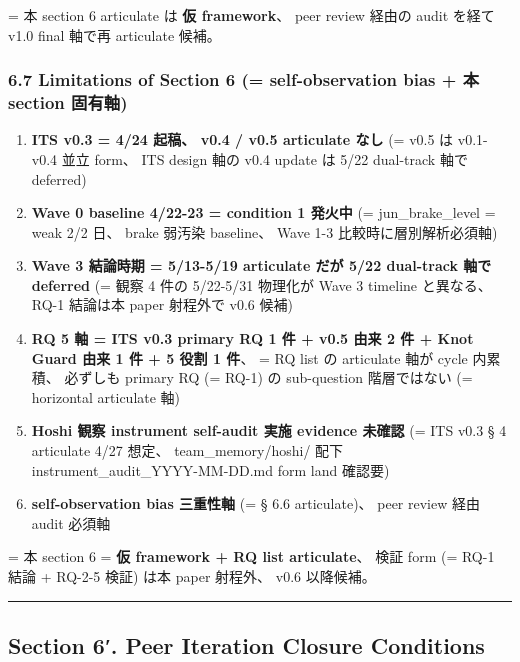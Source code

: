 \documentclass[
]{article}
\providecommand{\tightlist}{%
  \setlength{\itemsep}{0pt}\setlength{\parskip}{0pt}}
\begin{document}
= 本 section 6 articulate は \textbf{仮 framework}、 peer review 経由の
audit を経て v1.0 final 軸で再 articulate 候補。

\subsubsection{6.7 Limitations of Section 6 (= self-observation bias +
本 section
固有軸)}\label{limitations-of-section-6-self-observation-bias-ux672c-section-ux56faux6709ux8ef8}

\begin{enumerate}
\def\labelenumi{\arabic{enumi}.}
\tightlist
\item
  \textbf{ITS v0.3 = 4/24 起稿、 v0.4 / v0.5 articulate なし} (= v0.5 は
  v0.1-v0.4 並立 form、 ITS design 軸の v0.4 update は 5/22 dual-track
  軸で deferred)
\item
  \textbf{Wave 0 baseline 4/22-23 = condition 1 発火中} (=
  jun\_brake\_level = weak 2/2 日、 brake 弱汚染 baseline、 Wave 1-3
  比較時に層別解析必須軸)
\item
  \textbf{Wave 3 結論時期 = 5/13-5/19 articulate だが 5/22 dual-track
  軸で deferred} (= 観察 4 件の 5/22-5/31 物理化が Wave 3 timeline
  と異なる、 RQ-1 結論は本 paper 射程外で v0.6 候補)
\item
  \textbf{RQ 5 軸 = ITS v0.3 primary RQ 1 件 + v0.5 由来 2 件 + Knot
  Guard 由来 1 件 + 5 役割 1 件}、 = RQ list の articulate 軸が cycle
  内累積、 必ずしも primary RQ (= RQ-1) の sub-question 階層ではない (=
  horizontal articulate 軸)
\item
  \textbf{Hoshi 観察 instrument self-audit 実施 evidence 未確認} (= ITS
  v0.3 § 4 articulate 4/27 想定、 team\_memory/hoshi/ 配下
  instrument\_audit\_YYYY-MM-DD.md form land 確認要)
\item
  \textbf{self-observation bias 三重性軸} (= § 6.6 articulate)、 peer
  review 経由 audit 必須軸
\end{enumerate}

= 本 section 6 = \textbf{仮 framework + RQ list articulate}、 検証 form
(= RQ-1 結論 + RQ-2-5 検証) は本 paper 射程外、 v0.6 以降候補。

\begin{center}\rule{0.5\linewidth}{0.5pt}\end{center}

\subsection{Section 6′. Peer Iteration Closure
Conditions}\label{section-6.-peer-iteration-closure-conditions}
\end{document}
